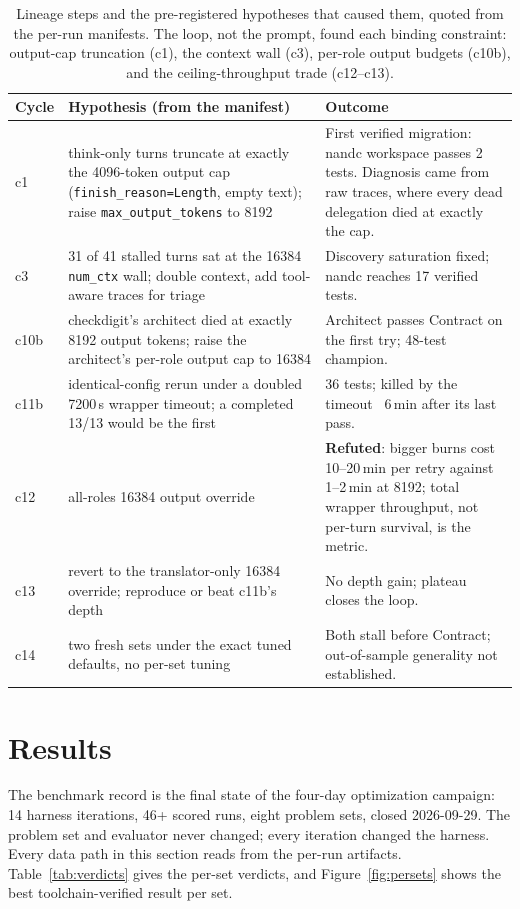 \documentclass[11pt]{article}
\begin{document}
\begin{table}[ht]
\centering
\begin{tabular}{@{}p{1.1cm}p{5.2cm}p{7.6cm}@{}}
\toprule
Cycle & Hypothesis (from the manifest) & Outcome \\
\midrule
c1 & think-only turns truncate at exactly the 4096-token output cap
(\texttt{finish\_reason=Length}, empty text); raise
\texttt{max\_output\_tokens} to 8192 & First verified migration:
nandc workspace passes 2 tests. Diagnosis came from raw traces, where
every dead delegation died at exactly the cap. \\
c3 & 31 of 41 stalled turns sat at the 16384 \texttt{num\_ctx} wall;
double context, add tool-aware traces for triage & Discovery
saturation fixed; nandc reaches 17 verified tests. \\
c10b & checkdigit's architect died at exactly 8192 output tokens;
raise the architect's per-role output cap to 16384 & Architect passes
Contract on the first try; 48-test champion. \\
c11b & identical-config rerun under a doubled 7200\,s wrapper timeout;
a completed 13/13 would be the first & 36 tests; killed by the
timeout ~6\,min after its last pass. \\
c12 & all-roles 16384 output override & \textbf{Refuted}: bigger burns
cost 10--20\,min per retry against 1--2\,min at 8192; total wrapper
throughput, not per-turn survival, is the metric. \\
c13 & revert to the translator-only 16384 override; reproduce or beat
c11b's depth & No depth gain; plateau closes the loop. \\
c14 & two fresh sets under the exact tuned defaults, no per-set
tuning & Both stall before Contract; out-of-sample generality not
established. \\
\bottomrule
\end{tabular}
\caption{Lineage steps and the pre-registered hypotheses that caused
them, quoted from the per-run manifests. The loop, not the prompt,
found each binding constraint: output-cap truncation (c1), the context
wall (c3), per-role output budgets (c10b), and the ceiling-throughput
trade (c12--c13).}
\label{tab:lineage}
\end{table}

\section{Results}
\label{sec:results}

The benchmark record is the final state of the four-day optimization
campaign: 14 harness iterations, 46+ scored runs, eight problem sets,
closed 2026-09-29. The problem set and evaluator never changed; every
iteration changed the harness. Every data path in this section reads
from the per-run artifacts.
Table~\ref{tab:verdicts} gives the
per-set verdicts, and Figure~\ref{fig:persets} shows the best
toolchain-verified result per set.
\end{document}
